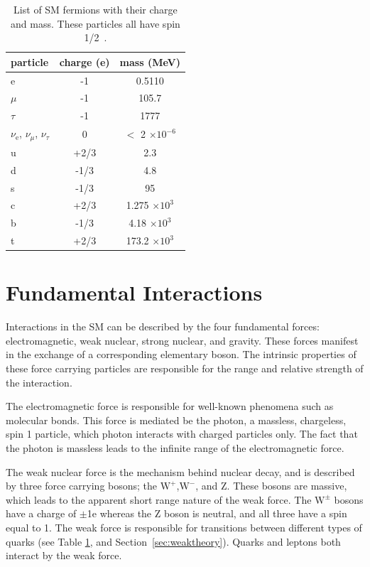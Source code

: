 \begin{table}[h]
\begin{center}
\begin{tabular}{l|c|c}
\hline
\hline
particle & charge (e) & mass (MeV)\\ \hline \hline
e & -1 & 0.5110 \\
$\mu$ & -1 & 105.7\\
$\tau$ & -1 & 1777\\
$\nu_{\mathrm{e}}$, $\nu_{\mu}$, $\nu_{\tau}$ & 0 & $<$ 2 $\times \mathrm{10^{-6}}$ \\
u & +2/3 & 2.3\\
d & -1/3 & 4.8\\
s & -1/3 & 95\\
c & +2/3 & 1.275 $\times \mathrm{10^3}$ \\
b & -1/3 & 4.18 $\times \mathrm{10^3}$\\
t & +2/3 & 173.2 $\times \mathrm{10^3}$\\
\hline
\end{tabular}
\end{center}
\caption{List of SM fermions with their charge and mass.  These particles all have spin 1/2~\cite{PDG-2014}.}
\label{table:SMferm}
\end{table}


\section{Fundamental Interactions}
Interactions in the SM can be described by the four fundamental forces: electromagnetic, weak nuclear, strong nuclear, and gravity.  
These forces manifest in the exchange of a corresponding elementary boson.  
The intrinsic properties of these force carrying particles are responsible for the range and relative strength of the interaction.


The electromagnetic force is responsible for well-known phenomena such as molecular bonds.  
This force is mediated be the photon, a massless, chargeless, spin 1 particle, which photon interacts with charged particles only.        
The fact that the photon is massless leads to the infinite range of the electromagnetic force.  


The weak nuclear force is the mechanism behind nuclear decay, and is described by three force carrying bosons; the $\mathrm{W^+}$,$\mathrm{W^-}$, and Z.  
These bosons are massive, which leads to the apparent short range nature of the weak force.  
The $\mathrm{W^{\pm}}$ bosons have a charge of $\pm$1e   whereas the Z boson is neutral, and all three have a spin equal to 1.  
The weak force is responsible for transitions between different types of quarks (see Table \ref{table:SMferm}, and Section~\ref{sec:weaktheory}).
Quarks and leptons both interact by the weak force.



